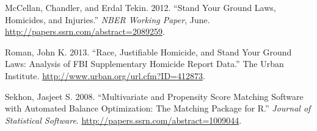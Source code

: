 \documentclass[12pt,article]{article}
\begin{document}
McCellan, Chandler, and Erdal Tekin. 2012. ``Stand Your Ground Laws,
Homicides, and Injuries.'' \emph{NBER Working Paper}, June.
\url{http://papers.ssrn.com/abstract=2089259}.

Roman, John K. 2013. ``Race, Justifiable Homicide, and Stand Your Ground
Laws: Analysis of FBI Supplementary Homicide Report Data.'' The Urban
Institute. \url{http://www.urban.org/url.cfm?ID=412873}.

Sekhon, Jasjeet S. 2008. ``Multivariate and Propensity Score Matching
Software with Automated Balance Optimization: The Matching Package for
R.'' \emph{Journal of Statistical Software}.
\url{http://papers.ssrn.com/abstract=1009044}.
\end{document}
